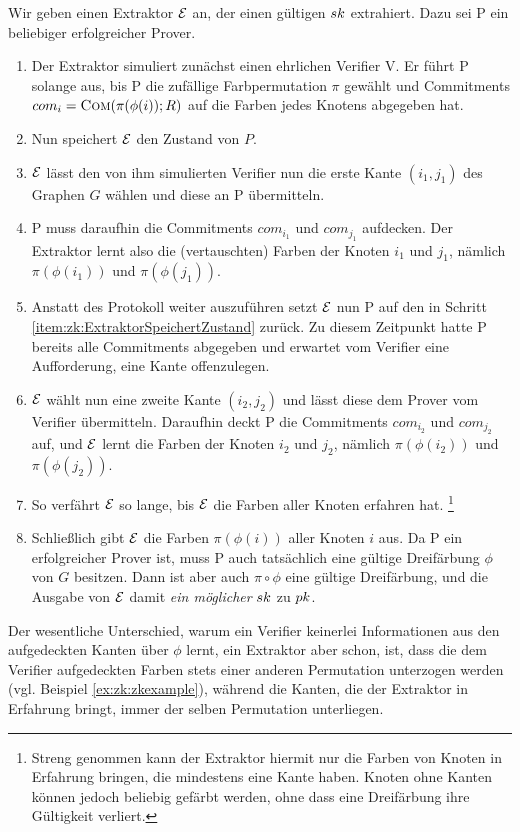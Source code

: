 \begin{beweis}
  Wir geben einen Extraktor $\mathcal{E}$ an, der einen gültigen $sk$ extrahiert. Dazu sei P ein beliebiger erfolgreicher Prover.
  
  \begin{enumerate}
  \item Der Extraktor simuliert zunächst einen ehrlichen Verifier V. Er
    führt P solange aus, bis P die zufällige Farbpermutation $\pi$
    gewählt und Commitments $com_i = \textsc{Com}(\pi(\phi(i));R)$ auf die
    Farben jedes Knotens abgegeben hat.	 
  \item \label{item:zk:ExtraktorSpeichertZustand}
    Nun speichert $\mathcal{E}$ den Zustand von $P$.
  \item $\mathcal{E}$ lässt den von ihm simulierten Verifier nun die erste
    Kante $(i_1, j_1)$ des Graphen $G$ wählen und diese an P
    übermitteln.
  \item P muss daraufhin die Commitments $com_{i_1}$ und $com_{j_1}$
    aufdecken. Der Extraktor lernt also die (vertauschten) Farben der
    Knoten $i_1$ und $j_1$, nämlich $\pi(\phi(i_1))$ und
    $\pi(\phi(j_1))$.
  \item Anstatt des Protokoll weiter auszuführen setzt $\mathcal{E}$ nun P auf
    den in Schritt \ref{item:zk:ExtraktorSpeichertZustand} zurück. Zu
    diesem Zeitpunkt hatte P bereits alle Commitments abgegeben und
    erwartet vom Verifier eine Aufforderung, eine Kante offenzulegen.
  \item $\mathcal{E}$ wählt nun eine zweite Kante $(i_2, j_2)$ und lässt diese
    dem Prover vom Verifier übermitteln. Daraufhin deckt P die
    Commitments $com_{i_2}$ und $com_{j_2}$ auf, und $\mathcal{E}$ lernt die
    Farben der Knoten $i_2$ und $j_2$, nämlich $\pi(\phi(i_2))$ und
    $\pi(\phi(j_2))$.
  \item So verfährt $\mathcal{E}$ so lange, bis $\mathcal{E}$ die Farben aller Knoten erfahren hat.
    \footnote{Streng genommen kann der Extraktor hiermit nur die Farben
      von Knoten in Erfahrung bringen, die mindestens eine Kante
      haben. Knoten ohne Kanten können jedoch beliebig gefärbt werden,
      ohne dass eine Dreifärbung ihre Gültigkeit verliert.} 
  \item Schließlich gibt $\mathcal{E}$ die Farben $\pi(\phi(i))$ aller Knoten
    $i$ aus. Da P ein erfolgreicher Prover ist, muss P auch tatsächlich
    eine gültige Dreifärbung $\phi$ von $G$ besitzen. Dann ist aber auch
    $\pi \circ \phi$ eine gültige Dreifärbung, und die Ausgabe von
    $\mathcal{E}$ damit \emph{ein möglicher} $sk$ zu $pk$.
  \end{enumerate}
\end{beweis}

Der wesentliche Unterschied, warum ein Verifier keinerlei Informationen
aus den aufgedeckten Kanten über $\phi$ lernt, ein Extraktor aber schon,
ist, dass die dem Verifier aufgedeckten Farben stets einer anderen
Permutation unterzogen werden (vgl. Beispiel \ref{ex:zk:zkexample}),
während die Kanten, die der Extraktor in Erfahrung bringt, immer der
selben Permutation unterliegen. 

